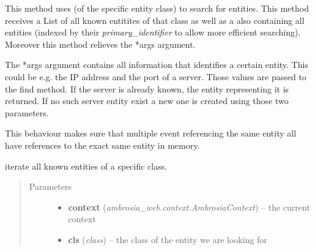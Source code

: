 \documentclass[letterpaper,10pt,english]{sphinxmanual}
\begin{document}
\begin{fulllineitems}
\begin{fulllineitems}
This method uses {\hyperref[ambrosia.model:ambrosia.model.Entity.find]{}} (of the specific entity class) to search for entities. This method
receives a List of all known entitites of that class as well as a  also containing
all entities (indexed by their \emph{primary\_identifier} to allow more efficient searching). Moreover this method
relieves the *args argument.

The *args argument contains all information that identifies a certain entity. This could be e.g. the IP address
and the port of a server. Those values are passed to the find method. If the server is already known, the entity
representing it is returned. If no such server entity exist a new one is created using those two parameters.

This behaviour makes sure that multiple event referencing the same entity all have references to the exact same
entity in memory.

\end{fulllineitems}


\begin{fulllineitems}
\label{ambrosia.model:ambrosia.model.Analysis.iter_all_events}
\end{fulllineitems}


\begin{fulllineitems}
\label{ambrosia.model:ambrosia.model.Analysis.iter_entities}
iterate all known entities of a specific class.
\begin{quote}\begin{description}
\item[{Parameters}] \leavevmode\begin{itemize}
\item {} 
\textbf{context} (\emph{ambrosia\_web.context.AmbrosiaContext}) -- the current context

\item {} 
\textbf{cls} (\emph{class}) -- the class of the entity we are looking for

\end{itemize}


\end{description}
\end{quote}
\end{fulllineitems}
\end{fulllineitems}
\end{document}
